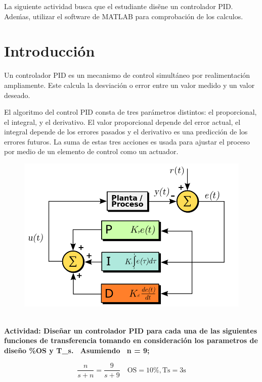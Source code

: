 \documentclass[12pt,letterpaper]{article}
\begin{document}
La siguiente actividad busca que el estudiante disẽne un controlador PID. Adeḿas, utilizar el software de MATLAB para comprobación de los calculos. 

\section{Introducción}

Un controlador PID es un mecanismo de control simultáneo por realimentación ampliamente. Este calcula la desviación o error entre un valor medido y un valor deseado. 

El algoritmo del control PID consta de tres parámetros distintos: el proporcional, el integral, y el derivativo. El valor proporcional depende del error actual, el integral depende de los errores pasados y el derivativo es una predicción de los errores futuros. La suma de estas tres acciones es usada para ajustar el proceso por medio de un elemento de control como un actuador.


\begin{figure}[h]
  \includegraphics[scale= 0.23]{pid.png}
  \label{fig:Bloques}
\end{figure} \\  

\textbf{Actividad: Diseñar un controlador PID para cada una de las siguientes funciones de transferencia tomando en consideración los parametros de diseño \%OS y T_{s}. \ Asumiendo \ n = 9; }


\begin{equation}\frac{n}{s+n} = \frac{9}{s+9} \quad \mathrm{OS}=10 \%, \mathrm{Ts}=3 \mathrm{s}\end{equation} 
\end{document}
